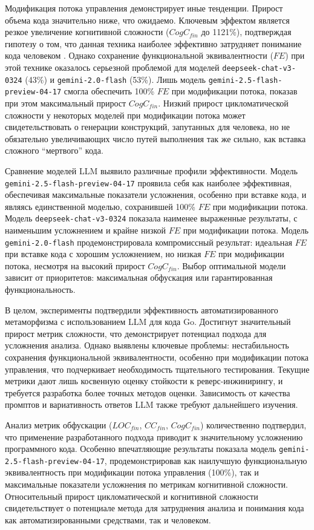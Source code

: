 Модификация потока управления демонстрирует иные тенденции. Прирост объема кода значительно ниже, что ожидаемо. Ключевым эффектом является резкое увеличение когнитивной сложности ($CogC_{fin}$ до 1121\%), подтверждая гипотезу о том, что данная техника наиболее эффективно затрудняет понимание кода человеком \cite{SonarSourceCogC}. Однако сохранение функциональной эквивалентности ($FE$) при этой технике оказалось серьезной проблемой для моделей \texttt{deepseek-chat-v3-0324} (43\%) и \texttt{gemini-2.0-flash} (53\%). Лишь модель \texttt{gemini-2.5-flash-preview-04-17} смогла обеспечить 100\% $FE$ при модификации потока, показав при этом максимальный прирост $CogC_{fin}$. Низкий прирост цикломатической сложности у некоторых моделей при модификации потока может свидетельствовать о генерации конструкций, запутанных для человека, но не обязательно увеличивающих число путей выполнения так же сильно, как вставка сложного \enquote{мертвого} кода.

Сравнение моделей LLM выявило различные профили эффективности. Модель \texttt{gemini-2.5-flash-preview-04-17} проявила себя как наиболее эффективная, обеспечивая максимальные показатели усложнения, особенно при вставке кода, и являясь единственной моделью, сохранившей 100\% $FE$ при модификации потока. Модель \texttt{deepseek-chat-v3-0324} показала наименее выраженные результаты, с наименьшим усложнением и крайне низкой $FE$ при модификации потока. Модель \texttt{gemini-2.0-flash} продемонстрировала компромиссный результат: идеальная $FE$ при вставке кода с хорошим усложнением, но низкая $FE$ при модификации потока, несмотря на высокий прирост $CogC_{fin}$. Выбор оптимальной модели зависит от приоритетов: максимальная обфускация или гарантированная функциональность.

В целом, эксперименты подтвердили эффективность автоматизированного метаморфизма с использованием LLM для кода Go. Достигнут значительный прирост метрик сложности, что демонстрирует потенциал подхода для усложнения анализа. Однако выявлены ключевые проблемы: нестабильность сохранения функциональной эквивалентности, особенно при модификации потока управления, что подчеркивает необходимость тщательного тестирования. Текущие метрики дают лишь косвенную оценку стойкости к реверс-инжинирингу, и требуется разработка более точных методов оценки. Зависимость от качества промптов и вариативность ответов LLM также требуют дальнейшего изучения.

Анализ метрик обфускации ($LOC_{fin}$, $CC_{fin}$, $CogC_{fin}$) количественно подтвердил, что применение разработанного подхода приводит к значительному усложнению программного кода. Особенно впечатляющие результаты показала модель \texttt{gemini-2.5-flash-preview-04-17}, продемонстрировав как наилучшую функциональную эквивалентность при модификации потока управления (100\%), так и максимальные показатели усложнения по метрикам когнитивной сложности. Относительный прирост цикломатической и когнитивной сложности свидетельствует о потенциале метода для затруднения анализа и понимания кода как автоматизированными средствами, так и человеком.
